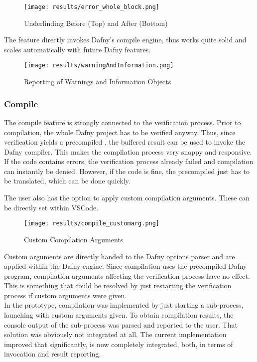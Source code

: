\begin{figure}[H]
    \centering
    \texttt{[image: results/error\_whole\_block.png]}
    \caption{Underlinding Before (Top) and After (Bottom)}
    \label{fig:error_whole_block}
\end{figure}

The feature directly invokes Dafny's compile engine, thus works quite solid and scales automatically with future Dafny features.

\begin{figure}[H]
    \centering
    \texttt{[image: results/warningAndInformation.png]}
    \caption{Reporting of Warnings and Information Objects}
    \label{fig:result_warnd_info}
\end{figure}

\subsubsection{Compile}
The compile feature is strongly connected to the verification process.
Prior to compilation, the whole Dafny project has to be verified anyway.
Thus, since verification yields a precompiled , the buffered result can be used to invoke the Dafny compiler.
This makes the compilation process very snappy and responsive.\\

If the code contains errors, the verification process already failed and compilation can instantly be denied.
However, if the code is fine, the precompiled  just has to be translated, which can be done quickly.

The user also has the option to apply custom compilation arguments.
These can be directly set within VSCode.
\begin{figure}[H]
    \centering
    \texttt{[image: results/compile\_customarg.png]}
    \caption{Custom Compilation Arguments}
    \label{fig:compilation_custom_args}
\end{figure}

Custom arguments are directly handed to the Dafny options parser and are applied within the Dafny engine.
Since compilation uses the precompiled Dafny program, compilation arguments affecting the verification process have no effect.
This is something that could be resolved by just restarting the verification process if custom arguments were given.\\

In the prototype, compilation was implemented by just starting a sub-process, launching  with custom arguments given.
To obtain compilation results, the console output of the sub-process was parsed and reported to the user.
That solution was obviously not integrated at all.
The current implementation improved that significantly, is now completely integrated, both, in terms of invocation and result reporting.


